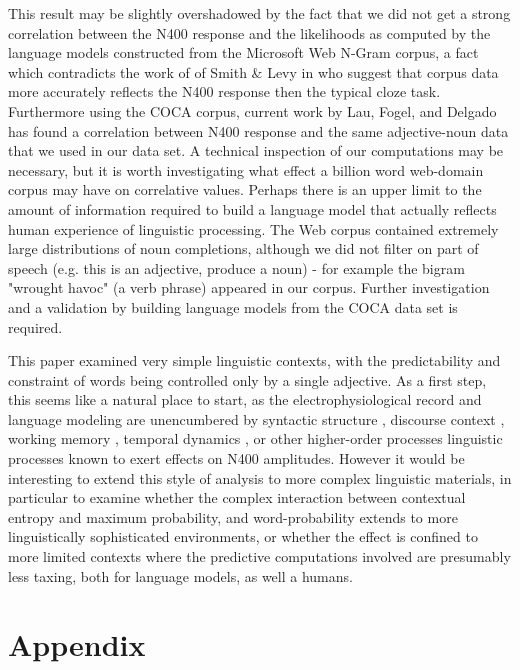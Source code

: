 \documentclass{article}
\begin{document}
This result may be slightly overshadowed by the fact that we did not get a strong correlation between the N400 response and the likelihoods as computed by the language models constructed from the Microsoft Web N-Gram corpus, a fact which contradicts the work of of Smith \& Levy in \cite{smith2011cloze} who suggest that corpus data more accurately reflects the N400 response then the typical cloze task. Furthermore using the COCA corpus, current work by Lau, Fogel, and Delgado has found a correlation between N400 response and the same adjective-noun data that we used in our data set. A technical inspection of our computations may be necessary, but it is worth investigating what effect a billion word web-domain corpus may have on correlative values. Perhaps there is an upper limit to the amount of information required to build a language model that actually reflects human experience of linguistic processing. The Web corpus contained extremely large distributions of noun completions, although we did not filter on part of speech (e.g. this is an adjective, produce a noun) - for example the bigram "wrought havoc" (a verb phrase) appeared in our corpus. Further investigation and a validation by building language models from the COCA data set is required.

This paper examined very simple linguistic contexts, with the predictability and constraint of words being controlled only by a single adjective. As a first step, this seems like a natural place to start, as the electrophysiological record and language modeling are unencumbered by syntactic structure \cite{kim2005}, discourse context \cite{otten2007}, working memory \cite{vanpetten1997}, temporal dynamics \cite{chowinprep}, or other higher-order processes linguistic processes known to exert effects on N400 amplitudes. However it would be interesting to extend this style of analysis to more complex linguistic materials, in particular to examine whether the complex interaction between contextual entropy and maximum probability, and word-probability extends to more linguistically sophisticated environments, or whether the effect is confined to more limited contexts where the predictive computations involved are presumably less taxing, both for language models, as well a humans.


\pagebreak




\section*{Appendix}
\end{document}
